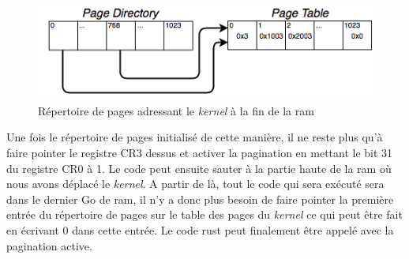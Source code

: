 \begin{figure}[!h]
  \centering
  \includegraphics[scale=0.65]{images/high_kern_pd.png}
  \caption{Répertoire de pages adressant le \textit{kernel} à la fin de la \acrshort{ram}}
  \label{high_kern_pd}
\end{figure}

Une fois le répertoire de pages initialisé de cette manière, il ne reste plus
qu'à faire pointer le registre CR3 dessus et activer la pagination en mettant
le bit 31 du registre CR0 à 1. Le code peut ensuite sauter à la partie haute de
la \acrshort{ram} où nous avons déplacé le \textit{kernel}. A partir de là,
tout le code qui sera exécuté sera dans le dernier Go de \acrshort{ram}, il n'y
a donc plus besoin de faire pointer la première entrée du répertoire de pages
sur le table des pages du \textit{kernel} ce qui peut être fait en écrivant 0
dans cette entrée. Le code rust peut finalement être appelé avec la pagination
active.